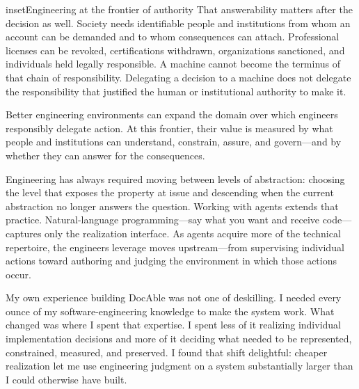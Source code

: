 \begin{bookbox}{inset}{Engineering at the frontier of authority}
That answerability matters after the decision as well. Society needs identifiable people and institutions from whom an account can be demanded and to whom consequences can attach. Professional licenses can be revoked, certifications withdrawn, organizations sanctioned, and individuals held legally responsible. A machine cannot become the terminus of that chain of responsibility. Delegating a decision to a machine does not delegate the responsibility that justified the human or institutional authority to make it.

Better engineering environments can expand the domain over which engineers responsibly delegate action. At this frontier, their value is measured by what people and institutions can understand, constrain, assure, and govern---and by whether they can answer for the consequences.
\end{bookbox}


Engineering has always required moving between levels of abstraction: choosing the level that exposes the property at issue and descending when the current abstraction no longer answers the question. Working with agents extends that practice. Natural-language programming---say what you want and receive code---captures only the realization interface. As agents acquire more of the technical repertoire, the engineer\textquotesingle s leverage moves upstream---from supervising individual actions toward authoring and judging the environment in which those actions occur.


My own experience building DocAble was not one of deskilling. I needed every ounce of my software-engineering knowledge to make the system work. What changed was where I spent that expertise. I spent less of it realizing individual implementation decisions and more of it deciding what needed to be represented, constrained, measured, and preserved. I found that shift delightful: cheaper realization let me use engineering judgment on a system substantially larger than I could otherwise have built.


